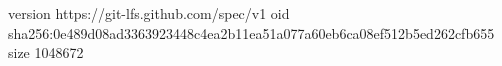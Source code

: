 version https://git-lfs.github.com/spec/v1
oid sha256:0e489d08ad3363923448c4ea2b11ea51a077a60eb6ca08ef512b5ed262cfb655
size 1048672
